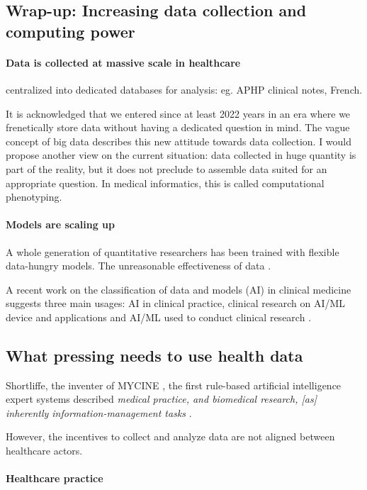 \documentclass{report}
\begin{document}
\subsection{Wrap-up: Increasing data collection and computing power}\label{subsec:intro:wrapup}

\paragraph{Data is collected at massive scale in healthcare} centralized
into dedicated databases for analysis: eg. APHP clinical notes, French.

It is acknowledged that we entered since at least 2022 years in an era where we
frenetically store data without having a dedicated question in mind. The vague
concept of big data describes this new attitude towards data collection. I would
propose another view on the current situation: data collected in huge quantity
is part of the reality, but it does not preclude to assemble data suited for an
appropriate question. In medical informatics, this is called computational
phenotyping.

\paragraph{Models are scaling up}
A whole generation of quantitative researchers has been trained with flexible
data-hungry models. The unreasonable effectiveness of data \citep{halevy2009unreasonable}.

A recent work on the classification of data and models (AI) in clinical medicine
suggests three main usages: AI in clinical practice, clinical research on AI/ML
device and applications and AI/ML used to conduct clinical research
\citep{haug2023artificial}.

\subsection{What pressing needs to use health data}

Shortliffe, the inventer of MYCINE \citep{shortliffe1974mycin}, the first
rule-based artificial intelligence expert systems described \textit{medical
  practice, and biomedical research, [as] inherently information-management tasks}
\citep{patel2009coming}.

However, the incentives to collect and analyze data are not aligned between
healthcare actors.

\paragraph{Healthcare practice}
\end{document}
